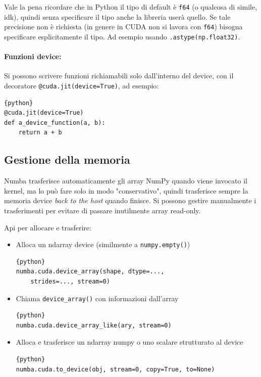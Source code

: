 Vale la pena ricordare che in Python il tipo di default è \texttt{f64} (o qualcosa di simile, idk), quindi senza specificare il tipo anche la libreria userà quello. Se tale precisione non è richiesta (in genere in CUDA non si lavora con \texttt{f64}) bisogna specificare esplicitamente il tipo. Ad esempio usando \texttt{.astype(np.float32)}.

\paragraph{Funzioni device:} Si possono scrivere funzioni richiamabili solo dall'interno del device, con il decoratore \texttt{@cuda.jit(device=True)}, ad esempio:
\begin{lstlisting}{python}
@cuda.jit(device=True)
def a_device_function(a, b):
    return a + b
\end{lstlisting}

\subsection{Gestione della memoria}

Numba trasferisce automaticamente gli array NumPy quando viene invocato il kernel, ma lo può fare solo in modo "conservativo", quindi trasferisce sempre la memoria device \textit{back to the host} quando finisce. Si possono gestire manualmente i trasferimenti per evitare di passare inutilmente array read-only.

Api per allocare e trasferire:
\begin{itemize}
	\item Alloca un ndarray device (similmente a \texttt{numpy.empty()})
	\begin{lstlisting}{python}
numba.cuda.device_array(shape, dtype=..., 
    strides=..., stream=0)
	\end{lstlisting}
	
	\item Chiama \texttt{device\_array()} con informazioni dall'array
	\begin{lstlisting}{python}
numba.cuda.device_array_like(ary, stream=0)
	\end{lstlisting}
	
	\item Alloca e trasferisce un ndarray numpy o uno scalare strutturato al device
	\begin{lstlisting}{python}
numba.cuda.to_device(obj, stream=0, copy=True, to=None)
	\end{lstlisting}
\end{itemize}

